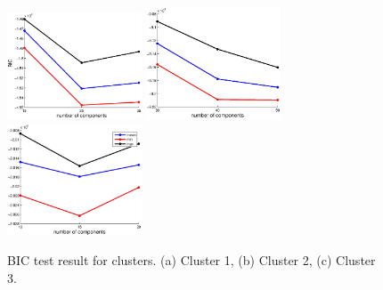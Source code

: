\documentclass[preprint,12pt]{elsarticle}
\begin{document}
\begin{figure}
  \centering
  \includegraphics[width=4cm]{./fig/bic_cluster1.eps}
  \includegraphics[width=4cm]{./fig/bic_cluster2.eps}
  \includegraphics[width=4cm]{./fig/bic_cluster3.eps}
  \caption{ \scriptsize{BIC test result for clusters. (a) Cluster 1, (b) Cluster 2, (c) Cluster 3.}
}

\label{fig:bic}
\end{figure}

\end{document}
